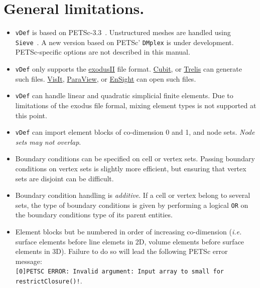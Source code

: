 \documentclass[10pt,oneside]{report}
\def\vDef{{\texttt{vDef}} }
\begin{document}
\section{General limitations.}
\begin{itemize}
\item \vDef is based on PETSc-3.3~\cite{petsc-efficient,petsc-user-ref,petsc-web-page}. Unstructured meshes are handled using \texttt{Sieve}~\cite{Knepley-Karpeev-2009a}. A new version based on PETSc' \texttt{DMplex} is under development. PETSc-specific options are not described in this manual.
\item \vDef only supports the \href{http://sourceforge.net/projects/exodusii/}{exodusII} file format. \href{http://cubit.sandia.gov}{Cubit}, or \href{http://www.csimsoft.com/trelis.jsp}{Trelis} can generate such files. \href{https://wci.llnl.gov/codes/visit/}{VisIt}, \href{http://paraview.org}{ParaView}, or \href{http://www.ceisoftware.com}{EnSight} can open such files.
\item \vDef can handle linear and quadratic simplicial finite elements. Due to limitations of the exodus file formal, mixing element types is not supported at this point.
\item \vDef can import element blocks of co-dimension 0 and 1, and node sets. \emph{Node sets may not overlap}.
\item Boundary conditions can be specified on cell or vertex sets. Passing boundary conditions on vertex sets is slightly more efficient, but ensuring that vertex sets are disjoint can be difficult.
\item Boundary condition handling is \emph{additive}. If a cell or vertex belong to several sets, the type of boundary conditions is given by performing a logical \verb+OR+ on the boundary conditions type of its parent entities. 
\item Element blocks but be numbered in order of increasing co-dimension (\emph{i.e.} surface elements before line elemets in 2D, volume elements before surface elements in 3D). Failure to do so will lead the following PETSc error message:\\
\verb+[0]PETSC ERROR: Invalid argument: Input array to small for restrictClosure()!+.
\end{itemize}
\end{document}
